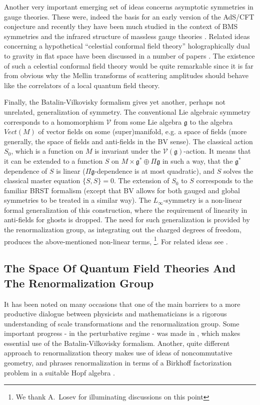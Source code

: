 \documentclass[12pt]{article}
\newcommand\CalV{\mathcal{V}}
\begin{document}
Another very important emerging set of ideas concerns asymptotic symmetries in gauge theories.
These were, indeed the basis for an early version of the AdS/CFT conjecture \cite{Brown:1986nw}
and recently they have been much studied in the context of BMS symmetries and the
infrared structure of massless gauge theories \cite{Strominger:2017zoo}. Related
ideas concerning a hypothetical ``celestial conformal field theory'' holographically dual
to gravity in flat space have been discussed in a number of papers  \cite{Raclariu:2021zjz}.
The existence of such a celestial conformal field theory
would be quite remarkable since it is far from obvious why the Mellin transforms of scattering amplitudes should behave like the correlators of a local quantum field theory.

Finally, the Batalin-Vilkovisky formalism gives yet another, perhaps not unrelated, generalization of symmetry. The conventional Lie algebraic symmetry corresponds to a homomorphism ${\CalV}$ from some Lie algebra $\mathfrak{g}$
to the algebra $Vect(M)$ of vector fields on some (super)manifold, e.g. a space of fields (more generally, the space of fields and anti-fields in the BV sense). The classical action $S_{0}$, which is a function on $M$ is invariant under the ${\CalV}({\mathfrak{g}})$-action. It means that it can be extended to a function $S$ on $M \times \mathfrak{g}^{*} \oplus {\Pi}{\mathfrak{g}}$ in such a way, that the $\mathfrak{g}^{*}$ dependence of $S$ is linear ($\Pi\mathfrak{g}$-dependence is at most quadratic), and $S$ solves the classical master equation $\{ S, S \} = 0$. The extension of $S_0$ to $S$ corresponds to the familiar BRST formalism (except that BV allows for both gauged and global symmetries to be treated in a similar way). The $L_{\infty}$-symmetry is a non-linear formal generalization of this construction, where the requirement of linearity in anti-fields for ghosts  is dropped. The need for such generalization is provided by the renormalization group, as integrating out the charged degrees of freedom, produces the above-mentioned non-linear terms, \footnote{We thank A.~Losev for illuminating discussions on this point}. For related ideas see  \cite{Verlinde:1992qa}. 



\subsection{The Space Of Quantum Field Theories And The Renormalization Group}

It has been noted on many occasions that one of the main barriers
to a more productive dialogue between physicists and mathematicians
is a rigorous understanding of scale transformations and the renormalization
group. Some important progress - in the perturbative regime - was made in
\cite{Costello:Renormalization}, which makes essential use of the 
Batalin-Vilkovisky formalism. Another, quite different approach to 
renormalization theory makes use of ideas of noncommutative geometry, 
and phrases renormalization in terms of a Birkhoff factorization problem 
in a suitable Hopf algebra \cite{Connes:1998qv,Connes:1999yr,Connes:2000fe}. 
\end{document}
